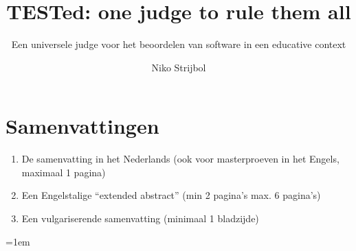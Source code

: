 \documentclass[
    12pt,
    parskip=half,
    titleUppercase=false,
    titleUnderline=false,
    uppercase=false,
    captions=tableheading
]{ugent2016-report}
\title{TESTed: one judge to rule them all}
\subtitle{Een universele judge voor het beoordelen van software in een educative context}
\author{\large Niko Strijbol}
\begin{document}
    \setmainfont{UGent Panno Text}

    \maketitle

    \setmainfont[Ligatures=TeX,Numbers=OldStyle,Contextuals=Alternate]{Libertinus Serif}
    \setsansfont[Ligatures=TeX,Numbers=OldStyle,Contextuals=Alternate]{Libertinus Sans}
    \setmonofont[Scale=MatchLowercase,Contextuals={Alternate}]{Jetbrains Mono}


    \chapter*{Samenvattingen}
    
    \begin{enumerate}
        \item De samenvatting in het Nederlands (ook voor masterproeven in het Engels, maximaal 1 pagina)
        \item Een Engelstalige “extended abstract” (min 2 pagina’s max. 6 pagina’s)
        \item Een vulgariserende samenvatting (minimaal 1 bladzijde)
    \end{enumerate}

    
    

    \addtocounter{tocdepth}{-1}
    \tableofcontents

    \newpage
    

    
    
    
    
    

    \emergencystretch=1em
    
    \printbibliography
    
    \appendix
    
    
    
\end{document}

